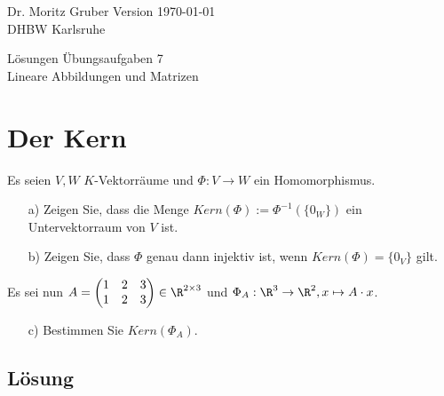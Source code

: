 




\vspace*{-20mm}
{
	\color{dhbwGray}
	Dr. Moritz Gruber	\hfill Version \today\\
	DHBW Karlsruhe\\
}

\vspace{10mm}
\begin{center}
	{
		\color{lightBlue}
		{ \LARGE 	L\"osungen \"Ubungsaufgaben 7}\\[3mm]
		{\Large Lineare Abbildungen und Matrizen}
	}
\end{center}

\vspace{5mm}




\section{Der Kern}
Es seien $V,W$ $K$-Vektorräume und $\Phi: V \to W$ ein Homomorphismus.
\begin{itemize}
\item[a)] Zeigen Sie, dass die Menge $Kern(\Phi):=\Phi^{-1}(\{0_W\})$ ein Untervektorraum von $V$ ist.
\item[b)] Zeigen Sie, dass $\Phi$ genau dann injektiv ist, wenn  $Kern(\Phi)=\{0_V\}$ gilt.
\end{itemize}
Es sei nun $A=\begin{pmatrix} 1&2&3 \\ 1&2&3 \end{pmatrix} \in \R^{2\times 3}$ und $\Phi_A: \R^3 \to \R^2, x \mapsto A \cdot x$.
\begin{itemize}
\item[c)] Bestimmen Sie $Kern(\Phi_A)$.
\end{itemize}


\subsection*{L\"osung}

